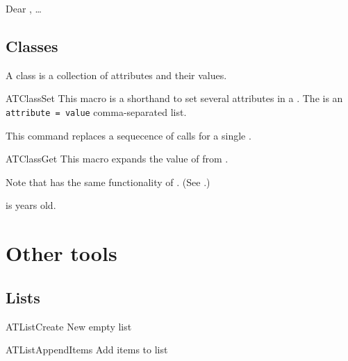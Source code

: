 \documentclass[a4paper, 11pt]{article}
\begin{document}
\begin{PDExample}
    Dear , \ldots
\end{PDExample}

\subsection{Classes}
A class is a collection of attributes and their values.

\begin{Macrodef}{ATClassSet}{}{}
    This macro is a shorthand to set several attributes in a . The  is an \mbox{\texttt{attribute~=~value}} comma-separated list.

    This command replaces a sequecence of  calls for a single .
\end{Macrodef}

\begin{Macrodef}{ATClassGet}{}{}
    This macro expands the value of  from .

    Note that  has the same functionality of . (See .)
\end{Macrodef}

\begin{PDExample}
      is  years old.
\end{PDExample}


\section{Other tools}

\subsection{Lists}

\begin{Macrodef}{ATListCreate}{}{}
    New empty list
\end{Macrodef}

\begin{Macrodef}{ATListAppendItems}{}{}
    Add items to list
\end{Macrodef}
\end{document}
